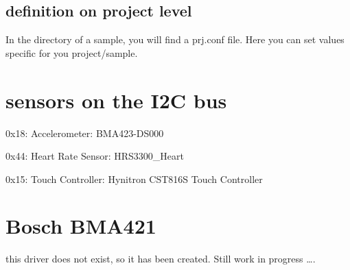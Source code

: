 \documentclass[letterpaper,10pt,english]{sphinxmanual}
\begin{document}
\subsection{definition on project level}
\label{\detokenize{drivers/i2c:definition-on-project-level}}
In the directory of a sample, you will find a prj.conf file.
Here you can set values specific for you project/sample.

\begin{sphinxVerbatim}[commandchars=\\\{\}]
         

\end{sphinxVerbatim}



\section{sensors on the I2C bus}
\label{\detokenize{drivers/sensors:sensors-on-the-i2c-bus}}\label{\detokenize{drivers/sensors::doc}}
0x18: Accelerometer: BMA423-DS000

0x44: Heart Rate Sensor: HRS3300\_Heart

0x15: Touch Controller: Hynitron CST816S Touch Controller


\section{Bosch BMA421}
\label{\detokenize{drivers/bma421:bosch-bma421}}\label{\detokenize{drivers/bma421::doc}}
this driver does not exist, so it has been created.
Still work in progress ….

\begin{sphinxVerbatim}[commandchars=\\\{\}]
\end{sphinxVerbatim}
\end{document}
